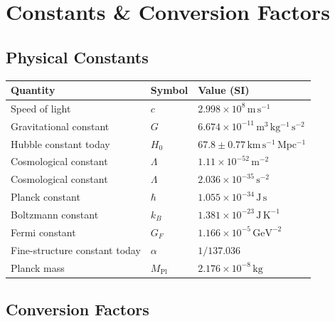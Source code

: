 \clearpage





\chapter{Constants \& Conversion Factors}

\section{Physical Constants}

\begin{center}
\begin{tabular}{lll}
\toprule
\textbf{Quantity} & \textbf{Symbol} & \textbf{Value (SI)} \\
\midrule
Speed of light         & $c$       & $2.998 \times 10^8 \,\mathrm{m\,s^{-1}}$           \\
Gravitational constant & $G$       & $6.674 \times 10^{-11} \,\mathrm{m^3\,kg^{-1}\,s^{-2}}$ \\
Hubble constant today  & $H_0$     & $67.8 \pm 0.77 \,\mathrm{km\,s^{-1}\,Mpc^{-1}}$     \\
Cosmological constant   & $\Lambda$ & $1.11 \times 10^{-52} \,\mathrm{m^{-2}}$           \\
Cosmological constant &$\Lambda$ & $2.036 \times 10^{-35} \,\mathrm{s^{-2}}$           \\
Planck constant         & $\hbar$   & $1.055 \times 10^{-34} \,\mathrm{J\,s}$                     \\
Boltzmann constant      & $k_B$     & $1.381 \times 10^{-23} \,\mathrm{J\,K^{-1}}$                    \\
Fermi constant           & $G_F$     & $1.166 \times 10^{-5} \,\mathrm{GeV^{-2}}$                    \\
Fine-structure constant today  & $\alpha$  & $1/137.036$ \\
Planck mass              & $M_\text{Pl}$ & $2.176 \times 10^{-8} \,\mathrm{kg}$ \\
\bottomrule
\end{tabular}
\end{center}

\section{Conversion Factors}

